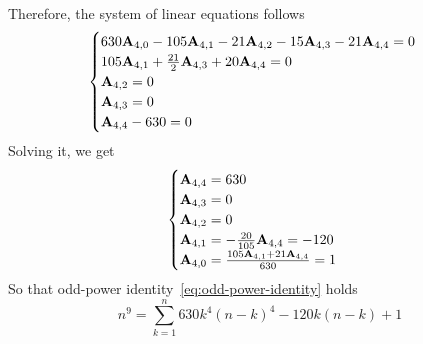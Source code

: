 \begin{examp}
\begin{equation*}
\begin{split}
        \end{split}
    \end{equation*}
    Therefore, the system of linear equations follows
    \begin{equation*}
        \begin{cases}
            630 {\mathbf{A}} \sb{4,0} - 105 {\mathbf{A}} \sb{4,1} - 21 {\mathbf{A}} \sb{4,2} - 15 {\mathbf{A}} \sb{4,3} - 21 {\mathbf{A}} \sb{4,4} = 0 \\
            105 {\mathbf{A}} \sb{4,1} + \frac{21}{2} {\mathbf{A}} \sb{4,3} + 20 {\mathbf{A}} \sb{4,4} = 0 \\
            {\mathbf{A}} \sb{4,2} = 0 \\
            {\mathbf{A}} \sb{4,3} = 0 \\
            {\mathbf{A}} \sb{4,4} - 630 = 0
        \end{cases}
    \end{equation*}
    Solving it, we get
    \begin{equation*}
        \begin{cases}
            {\mathbf{A}} \sb{4,4} = 630 \\
            {\mathbf{A}} \sb{4,3} = 0 \\
            {\mathbf{A}} \sb{4,2} = 0 \\
            {\mathbf{A}} \sb{4,1} = - \frac{20}{105} {\mathbf{A}} \sb{4,4} = -120 \\
            {\mathbf{A}} \sb{4,0} = \frac{105 {\mathbf{A}} \sb{4,1} + 21 {\mathbf{A}} \sb{4,4}}{630} = 1
        \end{cases}
    \end{equation*}
    So that odd-power identity~\eqref{eq:odd-power-identity} holds
    \begin{equation*}
        n^9 = \sum_{k=1}^{n} 630 k^4(n-k)^4 - 120k(n-k) + 1
    \end{equation*}
\end{examp}